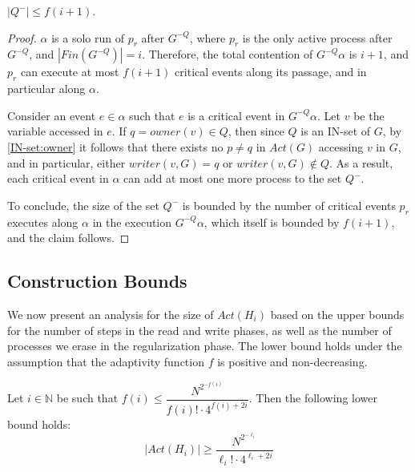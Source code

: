 \begin{claim-subsection} \label{claim: regularization-lower-bound}
	$|Q^-| \leq f(i+1)$.
\end{claim-subsection}

\begin{proof}
	$\alpha$ is a solo run of $p_r$ after $G^{-Q}$, where $p_r$ is the only active process after $G^{-Q}$, and $|Fin(G^{-Q})| = i$. Therefore, the total contention of $G^{-Q} \alpha$ is $i+1$, and $p_r$ can execute at most $f(i+1)$ critical events along its passage, and in particular along $\alpha$.
	
	Consider an event $e \in \alpha$ such that $e$ is a critical event in $G^{-Q} \alpha$. Let $v$ be the variable accessed in $e$. If $q = owner(v) \in Q$, then since $Q$ is an IN-set of $G$, by \ref{IN-set:owner} it follows that there exists no $p \neq q$ in $Act(G)$ accessing $v$ in $G$, and in particular, either $writer(v,G) = q$ or $writer(v,G) \notin Q$. As a result, each critical event in $\alpha$ can add at most one more process to the set $Q^-$.
	
	To conclude, the size of the set $Q^-$ is bounded by the number of critical events $p_r$ executes along $\alpha$ in the execution $G^{-Q} \alpha$, which itself is bounded by $f(i+1)$, and the claim follows.
\end{proof}









\newpage
\subsection{Construction Bounds}
We now present an analysis for the size of $Act(H_i)$ based on the upper bounds for the number of steps in the read and write phases, as well as the number of processes we erase in the regularization phase. The lower bound holds under the assumption that the adaptivity function $f$ is positive and non-decreasing.

\begin{theorem} \label{theorem: Act-lower-bound}
	Let $i \in \mathbb{N}$ be such that $f(i) \leq \dfrac{N^{2^{-f(i)}}} {f(i)! \cdot 4^{f(i)+2i}}$. Then the following lower bound holds:
	$$|Act(H_i)| \geq \frac{N^{2^{-\ell_i}}}{\ell_i! \cdot 4^{\ell_i+2i}}$$
\end{theorem}

